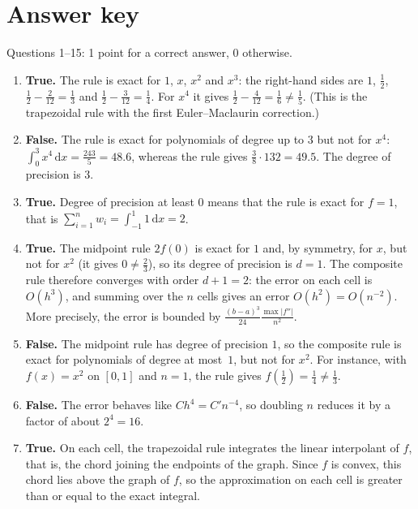 \documentclass[a4paper]{article}
\renewcommand{\d}{\mathrm d}
\begin{document}
\section*{Answer key}
\noindent Questions 1--15: 1 point for a correct answer, 0 otherwise.
\begin{enumerate}[itemsep=8pt]
    \item \textbf{True.}
        The rule is exact for $1$, $x$, $x^2$ and $x^3$:
        the right-hand sides are $1$, $\frac12$, $\frac12 - \frac{2}{12} = \frac13$ and $\frac12 - \frac{3}{12} = \frac14$.
        For $x^4$ it gives $\frac12 - \frac{4}{12} = \frac16 \neq \frac15$.
        (This is the trapezoidal rule with the first Euler--Maclaurin correction.)

    \item \textbf{False.}
        The rule is exact for polynomials of degree up to $3$ but not for $x^4$:
        $\int_0^3 x^4 \, \d x = \frac{243}{5} = 48.6$, whereas the rule gives $\frac{3}{8} \cdot 132 = 49.5$.
        The degree of precision is $3$.

    \item \textbf{True.}
        Degree of precision at least $0$ means that the rule is exact for $f = 1$,
        that is $\sum_{i=1}^n w_i = \int_{-1}^1 1 \, \d x = 2$.

    \item \textbf{True.}
        The midpoint rule $2 f(0)$ is exact for $1$ and, by symmetry, for $x$, but not for $x^2$ (it gives $0 \neq \frac{2}{3}$),
        so its degree of precision is $d = 1$.
        The composite rule therefore converges with order $d + 1 = 2$:
        the error on each cell is $O(h^{3})$, and summing over the $n$ cells gives an error $O(h^2) = O(n^{-2})$.
        More precisely, the error is bounded by $\frac{(b-a)^3}{24} \frac{\max \lvert f'' \rvert}{n^2}$.

    \item \textbf{False.}
        The midpoint rule has degree of precision $1$, so the composite rule is exact for polynomials of degree at most~$1$, but not for $x^2$.
        For instance, with $f(x) = x^2$ on $[0, 1]$ and $n = 1$, the rule gives $f(\frac12) = \frac14 \neq \frac13$.

    \item \textbf{False.}
        The error behaves like $C h^4 = C' n^{-4}$, so doubling $n$ reduces it by a factor of about $2^4 = 16$.

    \item \textbf{True.}
        On each cell, the trapezoidal rule integrates the linear interpolant of $f$, that is, the chord joining the endpoints of the graph.
        Since $f$ is convex, this chord lies above the graph of $f$, so the approximation on each cell is greater than or equal to the exact integral.


\end{enumerate}
\end{document}
